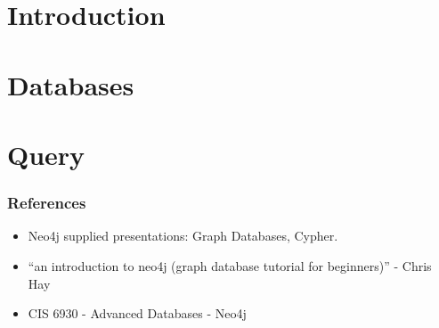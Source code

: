 \section[Intro]{Introduction}



\section[Db]{Databases}



\section[Query]{Query}



\begin{frame}\frametitle{References}
\begin{itemize}
\item Neo4j supplied presentations: Graph Databases, Cypher.
\item ``an introduction to neo4j (graph database tutorial for beginners)'' - Chris Hay
\item CIS 6930 - Advanced Databases - Neo4j 
\end{itemize}
\end{frame}